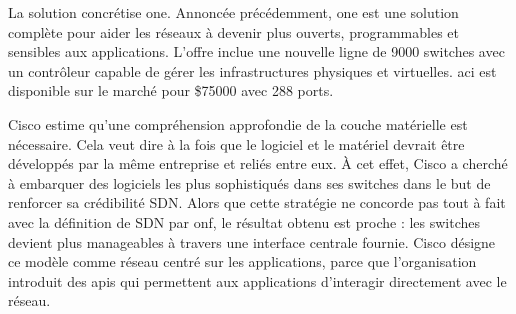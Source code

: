 La solution concrétise \gls{one}. Annoncée précédemment, \gls{one} est une solution complète pour aider les réseaux à devenir plus ouverts, programmables et sensibles aux applications. L'offre inclue une nouvelle ligne de 9000 switches avec un contrôleur capable de gérer les infrastructures physiques et virtuelles. \gls{aci} est disponible sur le marché pour \$75000 avec 288 ports. \cite{CiscoInsiemeLast}




Cisco estime qu'une compréhension approfondie de la couche matérielle est nécessaire. Cela veut dire à la fois que le logiciel et le matériel devrait être développés par la même entreprise et reliés entre eux. À cet effet, Cisco a cherché à embarquer des logiciels les plus sophistiqués dans ses switches dans le but de renforcer sa crédibilité SDN.
Alors que cette stratégie ne concorde pas tout à fait avec la définition de SDN par \gls{onf}, le résultat obtenu est proche : les switches devient plus manageables à travers une interface centrale fournie. Cisco désigne ce modèle comme réseau centré sur les applications, parce que l'organisation introduit des \glspl{api} qui permettent aux applications d'interagir directement avec le réseau. \cite{CiscoSDNONE}




